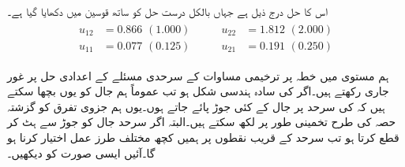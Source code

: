اس کا حل درج ذیل ہے جہاں بالکل درست حل کو ساتھ قوسین میں دکھایا گیا ہے۔
\begin{gather*}
\begin{aligned}
u_{12}&=0.866\,\,(1.000)\\
u_{11}&=0.077\,\,(0.125)
\end{aligned}\quad\quad
\begin{aligned}
u_{22}&=1.812\,\,(2.000)\\
u_{21}&=0.191\,\,(0.250)
\end{aligned}
\end{gather*}

ہم  مستوی میں خطہ  پر ترخیمی مساوات کے سرحدی مسئلے کے اعدادی حل پر غور جاری رکھتے ہیں۔اگر  کی سادہ ہندسی شکل ہو تب عموماً ہم جال کو یوں بچھا سکتے ہیں کہ  کی سرحد  پر جال کے کئی جوڑ پائے جاتے ہوں۔یوں ہم جزوی تفرق کو گزشتہ حصہ کی طرح تخمینی طور پر لکھ سکتے ہیں۔البتہ اگر سرحد  جال کو جوڑ سے ہٹ کر قطع کرتا ہو تب سرحد کے قریب نقطوں پر ہمیں کچھ مختلف طرز عمل اختیار کرنا ہو گا۔آئیں ایسی صورت کو دیکھیں۔

